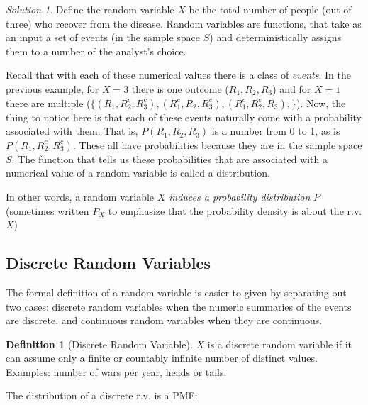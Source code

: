 \documentclass[
]{book}
\theoremstyle{definition}
\newtheorem{definition}{Definition}[chapter]
\theoremstyle{definition}
\theoremstyle{definition}
\theoremstyle{definition}
\theoremstyle{remark}
\newtheorem*{solution}{Solution}
\begin{document}
\begin{solution}
{}Define the random variable \(X\) be the total number of people (out of three) who recover from the disease. Random variables are functions, that take as an input a set of events (in the sample space \(S\)) and deterministically assigns them to a number of the analyst's choice.
\end{solution}

Recall that with each of these numerical values there is a class of \emph{events}. In the previous example, for \(X = 3\) there is one outcome (\(R_1, R_2, R_3\)) and for \(X = 1\) there are multiple (\(\{(R_1, R_2^c, R_3^c), (R_1^c, R_2, R_3^c), (R_1^c, R_2^c, R_3), \}\)). Now, the thing to notice here is that each of these events naturally come with a probability associated with them. That is, \(P(R_1, R_2, R_3)\) is a number from 0 to 1, as is \(P(R_1, R_2^c, R_3^c)\). These all have probabilities because they are in the sample space \(S\). The function that tells us these probabilities that are associated with a numerical value of a random variable is called a distribution.

In other words, a random variable \(X\) \emph{induces a probability distribution} \(P\) (sometimes written \(P_X\) to emphasize that the probability density is about the r.v. \(X\))

\hypertarget{discrete-random-variables}{%
\subsection*{Discrete Random Variables}\label{discrete-random-variables}}

The formal definition of a random variable is easier to given by separating out two cases: discrete random variables when the numeric summaries of the events are discrete, and continuous random variables when they are continuous.

\begin{definition}[Discrete Random Variable]
\protect\hypertarget{def:unnamed-chunk-262}{}{\label{def:unnamed-chunk-262} {} }\(X\) is a discrete random variable if it can assume only a finite or countably infinite number of distinct values. Examples: number of wars per year, heads or tails.
\end{definition}

The distribution of a discrete r.v. is a PMF:
\end{document}
